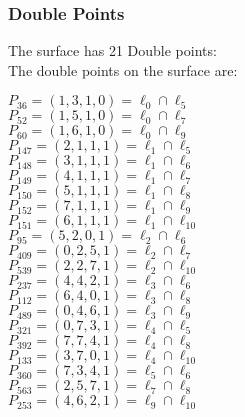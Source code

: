 \documentclass{article}
\begin{document}
{\subsubsection*{Double Points}
The surface has 21 Double points:\\
The double points on the surface are:\\
\begin{multicols}{2}
\noindent
$P_{36} = ( 1, 3, 1, 0 ) = \ell_{0} \cap \ell_{5} $\\
$P_{52} = ( 1, 5, 1, 0 ) = \ell_{0} \cap \ell_{7} $\\
$P_{60} = ( 1, 6, 1, 0 ) = \ell_{0} \cap \ell_{9} $\\
$P_{147} = ( 2, 1, 1, 1 ) = \ell_{1} \cap \ell_{5} $\\
$P_{148} = ( 3, 1, 1, 1 ) = \ell_{1} \cap \ell_{6} $\\
$P_{149} = ( 4, 1, 1, 1 ) = \ell_{1} \cap \ell_{7} $\\
$P_{150} = ( 5, 1, 1, 1 ) = \ell_{1} \cap \ell_{8} $\\
$P_{152} = ( 7, 1, 1, 1 ) = \ell_{1} \cap \ell_{9} $\\
$P_{151} = ( 6, 1, 1, 1 ) = \ell_{1} \cap \ell_{10} $\\
$P_{95} = ( 5, 2, 0, 1 ) = \ell_{2} \cap \ell_{6} $\\
$P_{409} = ( 0, 2, 5, 1 ) = \ell_{2} \cap \ell_{7} $\\
$P_{539} = ( 2, 2, 7, 1 ) = \ell_{2} \cap \ell_{10} $\\
$P_{237} = ( 4, 4, 2, 1 ) = \ell_{3} \cap \ell_{6} $\\
$P_{112} = ( 6, 4, 0, 1 ) = \ell_{3} \cap \ell_{8} $\\
$P_{489} = ( 0, 4, 6, 1 ) = \ell_{3} \cap \ell_{9} $\\
$P_{321} = ( 0, 7, 3, 1 ) = \ell_{4} \cap \ell_{5} $\\
$P_{392} = ( 7, 7, 4, 1 ) = \ell_{4} \cap \ell_{8} $\\
$P_{133} = ( 3, 7, 0, 1 ) = \ell_{4} \cap \ell_{10} $\\
$P_{360} = ( 7, 3, 4, 1 ) = \ell_{5} \cap \ell_{6} $\\
$P_{563} = ( 2, 5, 7, 1 ) = \ell_{7} \cap \ell_{8} $\\
$P_{253} = ( 4, 6, 2, 1 ) = \ell_{9} \cap \ell_{10} $\\
\end{multicols}
}
\end{document}
